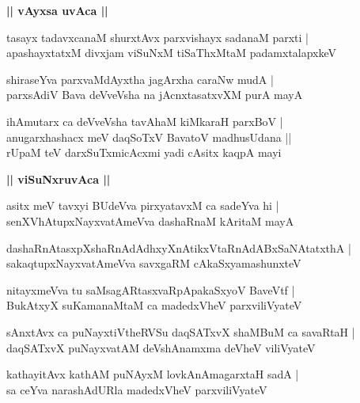 \documentclass[twoside,12pt,openright]{book}
\newcounter{shloka}[chapter]
\def\uvaca#1{\centerline{{\large\textbf{#1}}}}
\begin{document}
\uvaca{|| vAyxsa uvAca ||}

\begin{shloka}%
tasayx tadavxcanaM shurxtAvx parxvishayx sadanaM parxti |\\
apashayxtatxM divxjam viSuNxM tiSaThxMtaM padamxtalapxkeV 
\end{shloka}

\begin{shloka}%
shiraseYva parxvaMdAyxtha jagArxha caraNw mudA |\\
parxsAdiV Bava deVveVsha na jAcnxtasatxvXM purA mayA 
\end{shloka}

\begin{shloka}%
ihAmutarx ca deVveVsha tavAhaM kiMkaraH parxBoV |\\
anugarxhashacx meV daqSoTxV BavatoV madhusUdana ||\\
rUpaM teV darxSuTxmicAcxmi yadi cAsitx kaqpA mayi
\end{shloka}

\uvaca{|| viSuNxruvAca ||}

\begin{shloka}%
asitx meV tavxyi BUdeVva pirxyatavxM ca sadeYva hi |\\
senXVhAtupxNayxvatAmeVva dashaRnaM kAritaM mayA 
\end{shloka}

\begin{shloka}%
dashaRnAtasxpXshaRnAdAdhxyXnAtikxVtaRnAdABxSaNAtatxthA |\\
sakaqtupxNayxvatAmeVva savxgaRM cAkaSxyamashunxteV
\end{shloka}

\begin{shloka}%
nitayxmeVva tu saMsagARtasxvaRpApakaSxyoV BaveVtf |\\
BukAtxyX suKamanaMtaM ca madedxVheV parxviliVyateV 
\end{shloka}

\begin{shloka}%
sAnxtAvx ca puNayxtiVtheRVSu daqSATxvX shaMBuM ca savaRtaH |\\
daqSATxvX puNayxvatAM deVshAnamxma deVheV viliVyateV 
\end{shloka}

\begin{shloka}%
kathayitAvx kathAM puNAyxM lovkAnAmagarxtaH sadA |\\
sa ceYva narashAdURla madedxVheV parxviliVyateV 
\end{shloka}
\end{document}
